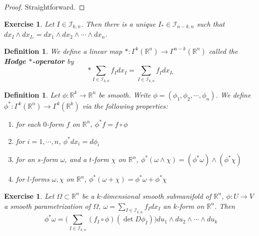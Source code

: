 \documentclass[12pt]{amsart}
\newtheorem{defn}[thm]{Definition}
\newtheorem{ex}[thm]{Exercise}
\newcommand{\om}{\omega}
\newcommand{\Om}{\Omega}
\newcommand{\R}{\mathbb{R}}
\newcommand{\MI}{\mathcal{I}}
\begin{document}
	\begin{proof}
		Straightforward.
	\end{proof}

	\begin{ex}
		Let $I \in \MI_{k, n}$. Then there is a unique $I_* \in \MI_{n-k, n}$ such that $dx_I \wedge dx_{I_*} = dx_1 \wedge dx_2 \wedge \cdots \wedge dx_n$.
	\end{ex}
	
	\begin{defn}
		We define a linear map $*:\Gamma^k(\R^n) \rightarrow \Gamma^{n-k}(\R^n)$ called the \textbf{Hodge $*$-operator} by $$* \sum\limits_{I \in \MI_{k,n}} f_I dx_I = \sum\limits_{I \in \MI_{k,n}} f_Idx_{I_*}$$
	\end{defn}

	\begin{defn}
		Let $\phi: \R^k \rightarrow \R^n$ be smooth. Write $\phi = (\phi_1, \phi_2, \cdots, \phi_n)$. We define $\phi^*:\Gamma^k(\R^n) \rightarrow \Gamma^k(\R^k)$ via the following properties: 
		\begin{enumerate}
			\item for each $0$-form $f$ on $\R^n$, $\phi^*f = f \circ \phi$
			\item  for $i = 1, \cdots , n$, $\phi^* dx_i = d\phi_i$ 
			\item for an $s$-form $\om$, and a $t$-form $\chi$ on $\R^n$,  $\phi^* (\om \wedge \chi) = (\phi^*\om) \wedge (\phi^*\chi)$
			\item for $l$-forms $\om, \chi$ on $\R^n$, $\phi^*(\om + \chi) = \phi^*\om + \phi^*\chi$ 
		\end{enumerate}
	\end{defn}

	\begin{ex}
			Let $\Om \subset \R^n$ be a $k$-dimensional smooth submanifold of $\R^n$, $\phi: U \rightarrow V$ a smooth parametrization of $\Om$, $\om = \sum_{I \in \MI_{k,n}} f_Idx_I$  an $k$-form on $\R^n$. Then $$\phi^* \om = \bigg( \sum_{I \in \MI_{k, n}} (f_I \circ \phi) (\det D\phi_I)\bigg)du_1 \wedge du_2 \wedge \cdots \wedge du_k$$ 
	\end{ex}
\end{document}
